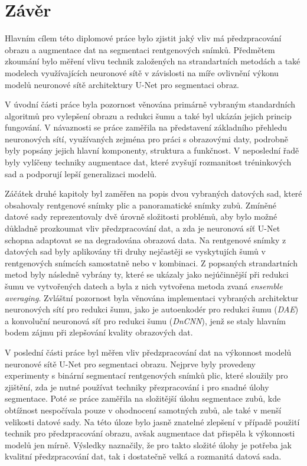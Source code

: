 \documentclass[male,czech,api_ing]{thesis}
\begin{document}
\chapter{Závěr}
Hlavním cílem této diplomové práce bylo zjistit jaký vliv má předzpracování obrazu a augmentace dat na segmentaci rentgenových snímků. Předmětem zkoumání bylo měření vlivu technik založených na strandartních metodách a také modelech využívajících neuronové sítě v závislosti na míře ovlivnění výkonu modelů neuronové sítě architektury U-Net pro segmentaci obraz.

V úvodní části práce byla pozornost věnována primárně vybraným standardních algoritmů pro vylepšení obrazu a redukci šumu a také byl ukázán jejich princip fungování. V návaznosti se práce zaměřila na představení základního přehledu neuronových sítí, využívaných zejména pro práci s obrazovými daty, podrobně byly popsány jejich hlavní komponenty, struktura a funkčnost. V neposlední řadě byly vylíčeny techniky augmentace dat, které zvyšují rozmanitost tréninkových sad a podporují lepší generalizaci modelů.

Záčátek druhé kapitoly byl zaměřen na popis dvou vybraných datových sad, které obsahovaly rentgenové snímky plic a panoramatické snímky zubů. Zmíněné datové sady reprezentovaly dvě úrovně složitosti problémů, aby bylo možné důkladně prozkoumat vliv předzpracování dat, a zda je neuronová síť U-Net schopna adaptovat se na degradována obrazová data. Na rentgenové snímky z datových sad byly aplikovány tři druhy nejčastěji se vyskytujích šumů v rentgenových snímcích samostatně nebo v kombinaci. Z popsaných strandartních metod byly následně vybrány ty, které se ukázaly jako nejúčinnější při redukci šumu ve vytvořených datech a byla z nich vytvořena metoda zvaná \textit{ensemble averaging}. Zvláštní pozornost byla věnována implementaci vybraných architektur neuronových sítí pro redukci šumu, jako je autoenkodér pro redukci šumu (\textit{DAE}) a konvoluční neuronová síť pro redukci šumu (\textit{DnCNN}), jenž se staly hlavním bodem zájmu při zlepšování kvality obrazových dat.

V poslední části práce byl měřen vliv předzpracování dat na výkonnost modelů neuronové sítě U-Net pro segmentaci obrazu. Nejprve byly provedeny experimenty s binární segmentací rentgenových snímků plic, které sloužily pro zjištění, zda je nutné používat techniky přezpracování i pro snadné úlohy segmentace. Poté se práce zaměřila na složitější úlohu segmentace zubů, kde obtížnost nespočívala pouze v ohodnocení samotných zubů, ale také v menší velikosti datové sady. Na této úloze bylo jasně znatelné zlepšení v případě použití technik pro předzpracování obrazu, avšak augmentace dat přispěla k výkonnosti modelů jen mírně. Výsledky naznačily, že pro takto složité úlohy je potřeba jak kvalitní předzpracování dat, tak i dostatečně velká a rozmanitá datová sada.
\end{document}
